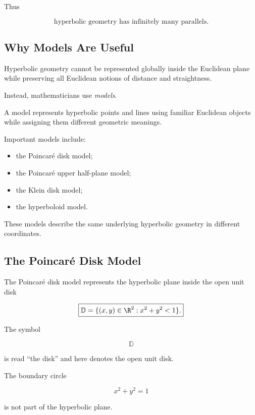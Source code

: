Thus

\[
\boxed{
\text{hyperbolic geometry has infinitely many parallels.}
}
\]

\subsection{Why Models Are Useful}
\label{subsec:hyperbolic-models}

Hyperbolic geometry cannot be represented globally inside the Euclidean
plane while preserving all Euclidean notions of distance and straightness.

Instead, mathematicians use \emph{models}.

A model represents hyperbolic points and lines using familiar Euclidean
objects while assigning them different geometric meanings.

Important models include:

\begin{itemize}
    \item the Poincar\'e disk model;
    \item the Poincar\'e upper half-plane model;
    \item the Klein disk model;
    \item the hyperboloid model.
\end{itemize}

These models describe the same underlying hyperbolic geometry in different
coordinates.

\subsection{The Poincar\'e Disk Model}
\label{subsec:poincare-disk}

The Poincar\'e disk model represents the hyperbolic plane inside the open
unit disk

\[
\boxed{
\mathbb{D}
=
\{(x,y)\in\R^2:x^2+y^2<1\}.
}
\]

The symbol

\[
\mathbb{D}
\]

is read ``the disk'' and here denotes the open unit disk.

The boundary circle

\[
x^2+y^2=1
\]

is not part of the hyperbolic plane.

